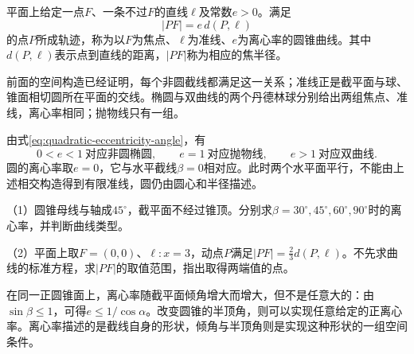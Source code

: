\begin{definition}\label{def:quadratic-focus-directrix}
平面上给定一点\(F\)、一条不过\(F\)的直线\(\ell\)及常数\(e>0\)。满足
\begin{equation}\label{eq:quadratic-focus-directrix}
    |PF|=e\,d(P,\ell)
\end{equation}
的点\(P\)所成轨迹，称为以\(F\)为{\heiti{}焦点}、\(\ell\)为{\heiti{}准线}、\(e\)为{\heiti{}离心率}的圆锥曲线。其中\(d(P,\ell)\)表示点到直线的距离，\(|PF|\)称为相应的{\heiti{}焦半径}。
\end{definition}

前面的空间构造已经证明，每个非圆截线都满足这一关系；准线正是截平面与球、锥面相切圆所在平面的交线。椭圆与双曲线的两个丹德林球分别给出两组焦点、准线，离心率相同；抛物线只有一组。

由式\eqref{eq:quadratic-eccentricity-angle}，有
\begin{equation}\label{eq:quadratic-eccentricity-types}
    0<e<1\ \text{对应非圆椭圆},\qquad
    e=1\ \text{对应抛物线},\qquad
    e>1\ \text{对应双曲线} .
\end{equation}
圆的离心率取\(e=0\)，它与水平截线\(\beta=0\)相对应。此时两个水平面平行，不能由上述相交构造得到有限准线，圆仍由圆心和半径描述。

\begin{example}
（1）圆锥母线与轴成\(45^\circ\)，截平面不经过锥顶。分别求\(\beta=30^\circ,45^\circ,60^\circ,90^\circ\)时的离心率，并判断曲线类型。

（2）平面上取\(F=(0,0)\)、\(\ell:x=3\)，动点\(P\)满足\(|PF|=\frac23d(P,\ell)\)。不先求曲线的标准方程，求\(|PF|\)的取值范围，指出取得两端值的点。
\end{example}

在同一正圆锥面上，离心率随截平面倾角增大而增大，但不是任意大的：由\(\sin\beta\le1\)，可得\(e\le1/\cos\alpha\)。改变圆锥的半顶角，则可以实现任意给定的正离心率。离心率描述的是截线自身的形状，倾角与半顶角则是实现这种形状的一组空间条件。

